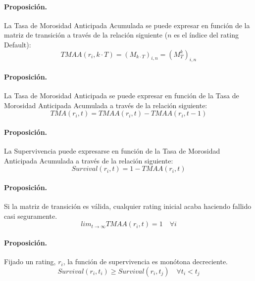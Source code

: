 \paragraph{Proposici\'on.} La Tasa de Morosidad Anticipada Acumulada se 
puede expresar en funci\'on de la matriz de transici\'on a trav\'es de la
relaci\'on siguiente ($n$ es el \'indice del rating Default):
\begin{displaymath}
TMAA(r_i,k \cdot T) = (M_{k \cdot T})_{i,n} = (M_{T}^{k})_{i,n}
\end{displaymath}

\paragraph{Proposici\'on.} La Tasa de Morosidad Anticipada se puede expresar 
en funci\'on de la Tasa de Morosidad Anticipada Acumulada a trav\'es de la
relaci\'on siguiente:
\begin{displaymath}
TMA(r_i, t) =  TMAA(r_i, t) - TMAA(r_i, t-1)
\end{displaymath}

\paragraph{Proposici\'on.} La Supervivencia puede expresarse en funci\'on de
la Tasa de Morosidad Anticipada Acumulada a trav\'es de la relaci\'on siguiente:
\begin{displaymath}
Survival(r_i, t) =  1 - TMAA(r_i, t)
\end{displaymath}

\paragraph{Proposici\'on.} Si la matriz de transici\'on es v\'alida, cualquier 
rating inicial acaba haciendo fallido casi seguramente.
\begin{displaymath}
lim_{t \to \infty} TMAA(r_i, t) =  1 \quad \forall i
\end{displaymath}

\paragraph{Proposici\'on.} Fijado un rating, $r_i$, la funci\'on de 
supervivencia es mon\'otona decreciente.
\begin{displaymath}
Survival(r_i, t_i) \ge Survival(r_i, t_j) \quad \forall t_i < t_j
\end{displaymath}

